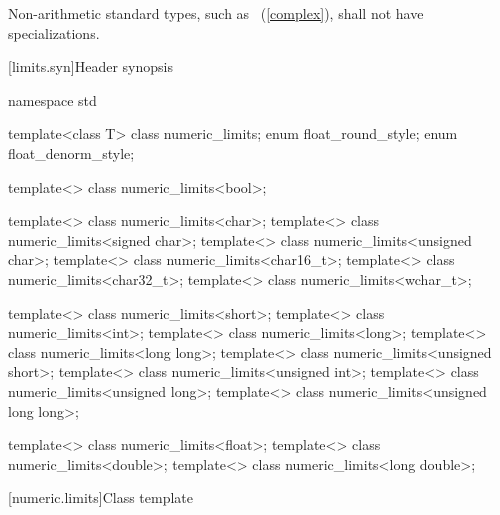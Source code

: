 \pnum
Non-arithmetic standard types, such as
~(\ref{complex}), shall not have specializations.

[limits.syn]{Header  synopsis}
%
%
%
%
%
%

\begin{codeblock}
namespace std {
  template<class T> class numeric_limits;
  enum float_round_style;
  enum float_denorm_style;

  template<> class numeric_limits<bool>;

  template<> class numeric_limits<char>;
  template<> class numeric_limits<signed char>;
  template<> class numeric_limits<unsigned char>;
  template<> class numeric_limits<char16_t>;
  template<> class numeric_limits<char32_t>;
  template<> class numeric_limits<wchar_t>;

  template<> class numeric_limits<short>;
  template<> class numeric_limits<int>;
  template<> class numeric_limits<long>;
  template<> class numeric_limits<long long>;
  template<> class numeric_limits<unsigned short>;
  template<> class numeric_limits<unsigned int>;
  template<> class numeric_limits<unsigned long>;
  template<> class numeric_limits<unsigned long long>;

  template<> class numeric_limits<float>;
  template<> class numeric_limits<double>;
  template<> class numeric_limits<long double>;
}
\end{codeblock}

[numeric.limits]{Class template }

